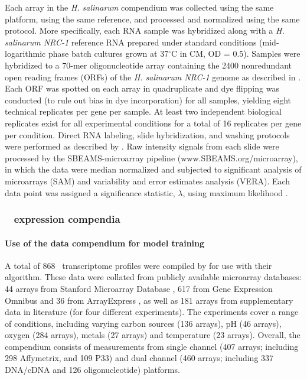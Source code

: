 Each array in the {\it H. salinarum} compendium was collected using
the same platform, using the same reference, and processed and
normalized using the same protocol. More specifically, each RNA sample
was hybridized along with a {\it H. salinarum NRC-1} reference RNA
prepared under standard conditions (mid-logarithmic phase batch
cultures grown at 37$^{\circ}$C in CM, OD = 0.5). Samples were hybridized to a
70-mer oligonucleotide array containing the 2400 nonredundant open
reading frames (ORFs) of the {\it H. salinarum NRC-1} genome as
described in \cite{Baliga2004a}. Each ORF was spotted on each array
in quadruplicate and dye flipping was conducted (to rule out bias in
dye incorporation) for all samples, yielding eight technical
replicates per gene per sample. At least two independent biological
replicates exist for all experimental conditions for a total of 16
replicates per gene per condition. Direct RNA labeling, slide
hybridization, and washing protocols were performed as described by
\cite{Facciotti2007,Schmid2007}. Raw intensity signals
from each slide were processed by the SBEAMS-microarray pipeline
\cite{Marzolf2006a} (www.SBEAMS.org/microarray), in which the
data were median normalized and subjected to significant analysis of
microarrays (SAM) and variability and error estimates analysis
(VERA). Each data point was assigned a significance statistic,
$\lambda$, using maximum likelihood \cite{Ideker2000}.

\subsubsection{\eco~ expression compendia}\label{ecodata}

\paragraph{Use of the  data compendium for model training}

A total of 868 \eco\ transcriptome profiles were compiled by
\cite{Lemmens2009a} for use with their  algorithm. 
These data were collated from publicly available microarray databases:
44 arrays from Stanford Microarray Database \cite{Demeter2007d},
617 from Gene Expression Omnibus \cite{Barrett2007} and 36 from
ArrayExpress \cite{Parkinson2007}, as well as 181 arrays from
supplementary data in literature (for four different experiments). The
experiments cover a range of conditions, including varying carbon
sources (136 arrays), pH (46 arrays), oxygen (284 arrays), metals (27
arrays) and temperature (23 arrays). Overall, the compendium consists
of measurements from single channel (407 arrays; including 298 Affymetrix, 
and 109 P33) and dual channel (460 arrays; including 337 DNA/cDNA
and 126 oligonucleotide) platforms.

